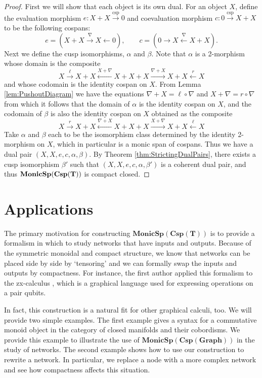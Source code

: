 \documentclass[11pt]{amsart}
\newcommand{\from}{\colon}
\newcommand{\xto}[1]{\xrightarrow{#1}}
\newcommand{\tocospan}{\xrightarrow{\mathrm{csp}}}
\newcommand{\bimonspcsp}[1]{\mathbf{MonicSp(Csp(#1))}}
\theoremstyle{remark}
\theoremstyle{definition}
\begin{document}
\begin{proof}
	First we will show that each object is its own dual. 
	For an object $X$,  
	define the evaluation morphism 
		$e \from X + X \tocospan 0$ 
	and coevaluation morphism 
		$c \from 0 \tocospan X+X$ 
	to be the following cospans:
	\[
		e = (X+X \xto{\nabla} X \gets 0), 
		\quad \quad 
		c = (0 \to X \xleftarrow{\nabla} X+X).
	\]
	Next we define the cusp isomorphisms, 
		$\alpha$ and $\beta$.
	Note that $\alpha$ is a 2-morphism 
	whose domain is the composite 
	\[
		X \xto{\ell}
		X+X \xleftarrow{X+\nabla}
		X+X+X \xto{\nabla +X}
		X+X \xleftarrow{r}
		X
	\]
	and whose codomain is the identity cospan on $X$.  
	From Lemma \ref{lem:PushoutDiagram} 
	we have the equations
		$\nabla+X = \ell \circ \nabla$ 
	and 
		$X + \nabla = r \circ \nabla$ 
	from which it follows that the domain of $\alpha$ is 
	the identity cospan on $X$, and  
	the codomain of $\beta$ is also 
	the identity cospan on $X$
	obtained as the composite 
	\[
		X \xto{r}
		X+X \xleftarrow{\nabla+X}
		X+X+X \xto{X+\nabla}
		X+X \xleftarrow{\ell}
		X
	\]
	Take $\alpha$ and $\beta$ each 
	to be the isomorphism class determined by the identity 2-morphism on $X$, which in particular is a monic span of cospans.
	Thus we have a dual pair 
		$(X,X,e,c,\alpha,\beta)$. 
	By Theorem 
		\ref{thm:StrictingDualPairs}, 
	there exists a cusp isomorphism $\beta'$ 
	such that 
		$(X,X,e,c,\alpha,\beta')$ 
	is a coherent dual pair, and thus $\bold{MonicSp(Csp(T))}$ is compact closed.  
\end{proof}

\section{Applications} %
\label{sec:Applications}

The primary motivation for constructing $\bimonspcsp{T}$
is to provide a formalism in which to study networks
that have inputs and outputs.
Because of the symmetric monoidal and compact structure,
we know that networks can be placed side by side 
by `tensoring' and we can formally swap the inputs
and outputs by compactness. 
For instance, the first author applied this formalism
to the zx-calculus \cite{Cic_zx}, which is a graphical
language used for expressing operations
on a pair qubits.

In fact, this construction is a natural 
fit for other graphical calculi, too. 
We will provide two simple examples.
The first example gives a syntax
for a commutative monoid object in the category
of closed manifolds and their cobordisms.
We provide this example to illustrate 
the use of $\bimonspcsp{Graph}$ in the 
study of networks.
The second example shows how to use 
our construction to rewrite a network. 
In particular, we replace
a node with a more complex network
and see how compactness affects
this situation.  
\end{document}
